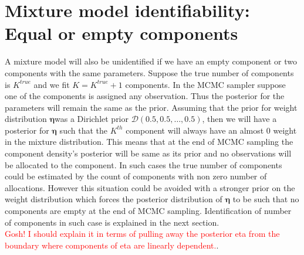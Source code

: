 \section{Mixture model identifiability: Equal or empty components}
A mixture model will also be unidentified if we have an empty component or two components with the same parameters. Suppose the true number of components is $K^{true}$ and we fit $K = K^{true} + 1$ components. In the MCMC sampler suppose one of the components is assigned any observation. Thus the posterior for the parameters will remain the same as the prior. Assuming that the prior for weight distribution $\boldsymbol{\eta}$was a Dirichlet prior $\mathcal{D}(0.5, 0.5, \ldots, 0.5)$, then we will have a posterior for $\boldsymbol{\eta}$ such that the $K^{th}$ component will always have an almost 0 weight in the mixture distribution. This means that at the end of MCMC sampling the component density's posterior will be same as its prior and no observations will be allocated to the component. In such cases the true number of components could be estimated by the count of components with non zero number of allocations. However this situation could be avoided with a stronger prior on the weight distribution which forces the posterior distribution of $\boldsymbol{\eta}$ to be such that no components are empty at the end of MCMC sampling. Identification of number of components in such case is explained in the next section.\\

\textcolor{red}{Gosh! I should explain it in terms of pulling away the posterior eta from the boundary where components of eta are linearly dependent.}. 